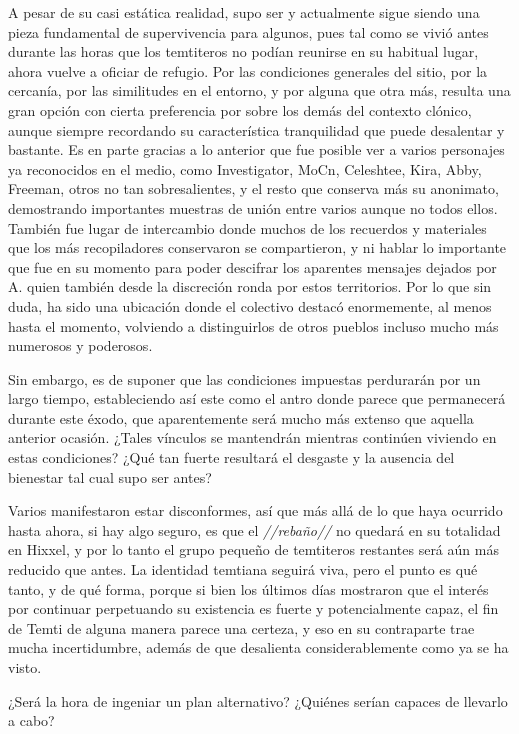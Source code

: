 \documentclass[
  spanish,
]{book}
\begin{document}
A pesar de su casi estática realidad, supo ser y actualmente sigue siendo una pieza fundamental de supervivencia para algunos, pues tal como se vivió antes durante las horas que los temtiteros no podían reunirse en su habitual lugar, ahora vuelve a oficiar de refugio. Por las condiciones generales del sitio, por la cercanía, por las similitudes en el entorno, y por alguna que otra más, resulta una gran opción con cierta preferencia por sobre los demás del contexto clónico, aunque siempre recordando su característica tranquilidad que puede desalentar y bastante. Es en parte gracias a lo anterior que fue posible ver a varios personajes ya reconocidos en el medio, como Investigator, MoCn, Celeshtee, Kira, Abby, Freeman, otros no tan sobresalientes, y el resto que conserva más su anonimato, demostrando importantes muestras de unión entre varios aunque no todos ellos. También fue lugar de intercambio donde muchos de los recuerdos y materiales que los más recopiladores conservaron se compartieron, y ni hablar lo importante que fue en su momento para poder descifrar los aparentes mensajes dejados por A. quien también desde la discreción ronda por estos territorios. Por lo que sin duda, ha sido una ubicación donde el colectivo destacó enormemente, al menos hasta el momento, volviendo a distinguirlos de otros pueblos incluso mucho más numerosos y poderosos.

Sin embargo, es de suponer que las condiciones impuestas perdurarán por un largo tiempo, estableciendo así este como el antro donde parece que permanecerá durante este éxodo, que aparentemente será mucho más extenso que aquella anterior ocasión. ¿Tales vínculos se mantendrán mientras continúen viviendo en estas condiciones? ¿Qué tan fuerte resultará el desgaste y la ausencia del bienestar tal cual supo ser antes?

Varios manifestaron estar disconformes, así que más allá de lo que haya ocurrido hasta ahora, si hay algo seguro, es que el \emph{//rebaño//} no quedará en su totalidad en Hixxel, y por lo tanto el grupo pequeño de temtiteros restantes será aún más reducido que antes. La identidad temtiana seguirá viva, pero el punto es qué tanto, y de qué forma, porque si bien los últimos días mostraron que el interés por continuar perpetuando su existencia es fuerte y potencialmente capaz, el fin de Temti de alguna manera parece una certeza, y eso en su contraparte trae mucha incertidumbre, además de que desalienta considerablemente como ya se ha visto.

¿Será la hora de ingeniar un plan alternativo? ¿Quiénes serían capaces de llevarlo a cabo?
\end{document}
